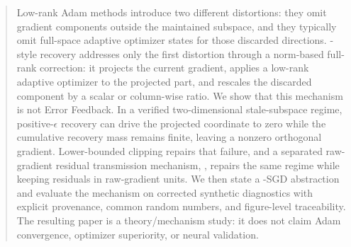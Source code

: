 \begin{abstract}
Low-rank Adam methods introduce two different distortions: they omit gradient
components outside the maintained subspace, and they typically omit full-space
adaptive optimizer states for those discarded directions. \Fira-style recovery
addresses only the first distortion through a norm-based full-rank correction:
it projects the current gradient, applies a low-rank adaptive optimizer to the
projected part, and rescales the discarded component by a scalar or column-wise
ratio. We show that this mechanism is not Error Feedback. In a verified
two-dimensional stale-subspace regime, positive-$\epsilon$ recovery can drive
the projected coordinate to zero while the cumulative recovery mass remains
finite, leaving a nonzero orthogonal gradient. Lower-bounded clipping repairs
that failure, and a separated raw-gradient residual transmission mechanism,
\BECR, repairs the same regime while keeping residuals in raw-gradient units.
We then state a \BECR-SGD abstraction and evaluate the mechanism on corrected
synthetic diagnostics with explicit provenance, common random numbers, and
figure-level traceability. The resulting paper is a theory/mechanism study: it
does not claim Adam convergence, optimizer superiority, or neural validation.
\end{abstract}
